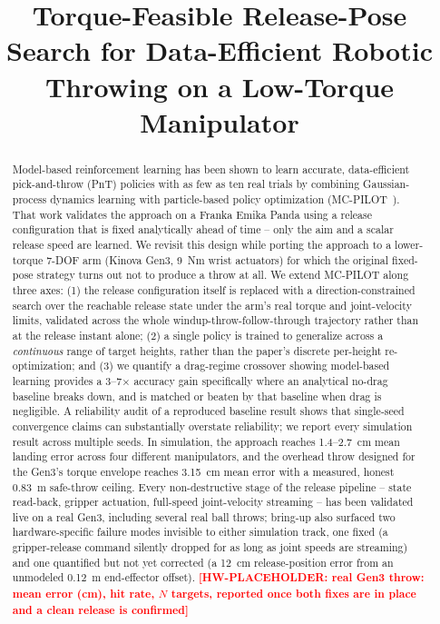\documentclass[conference]{IEEEtran}
\newcommand{\hwtodo}[1]{\textcolor{red}{\textbf{[HW-PLACEHOLDER: #1]}}}
\begin{document}
\title{Torque-Feasible Release-Pose Search for Data-Efficient Robotic
Throwing on a Low-Torque Manipulator}

\author{
}

\maketitle

\begin{abstract}
Model-based reinforcement learning has been shown to learn accurate,
data-efficient pick-and-throw (PnT) policies with as few as ten real trials
by combining Gaussian-process dynamics learning with particle-based policy
optimization (MC-PILOT~\cite{turcato2025mcpilot}). That work validates the
approach on a Franka Emika Panda using a release configuration that is fixed
analytically ahead of time -- only the aim and a scalar release speed are
learned. We revisit this design while porting the approach to a
lower-torque 7-DOF arm (Kinova Gen3, 9~Nm wrist actuators) for which the
original fixed-pose strategy turns out not to produce a throw at all. We
extend MC-PILOT along three axes: (1) the release configuration itself is
replaced with a direction-constrained search over the reachable release
state under the arm's real torque and joint-velocity limits, validated
across the whole windup-throw-follow-through trajectory rather than at the
release instant alone; (2) a single policy is trained to generalize across a
\emph{continuous} range of target heights, rather than the paper's discrete
per-height re-optimization; and (3) we quantify a drag-regime crossover
showing model-based learning provides a 3--7$\times$ accuracy gain
specifically where an analytical no-drag baseline breaks down, and is
matched or beaten by that baseline when drag is negligible. A reliability
audit of a reproduced baseline result shows that single-seed convergence
claims can substantially overstate reliability; we report every simulation
result across multiple seeds. In simulation, the approach reaches
1.4--2.7~cm mean landing error across four different manipulators, and the
overhead throw designed for the Gen3's torque envelope reaches 3.15~cm mean
error with a measured, honest 0.83~m safe-throw ceiling. Every
non-destructive stage of the release pipeline -- state read-back, gripper
actuation, full-speed joint-velocity streaming -- has been validated live on
a real Gen3, including several real ball throws; bring-up also surfaced two
hardware-specific failure modes invisible to either simulation track, one
fixed (a gripper-release command silently dropped for as long as joint
speeds are streaming) and one quantified but not yet corrected (a 12~cm
release-position error from an unmodeled 0.12~m end-effector offset).
\hwtodo{real Gen3 throw: mean error (cm), hit rate, $N$ targets, reported
once both fixes are in place and a clean release is confirmed}
\end{abstract}
\end{document}

